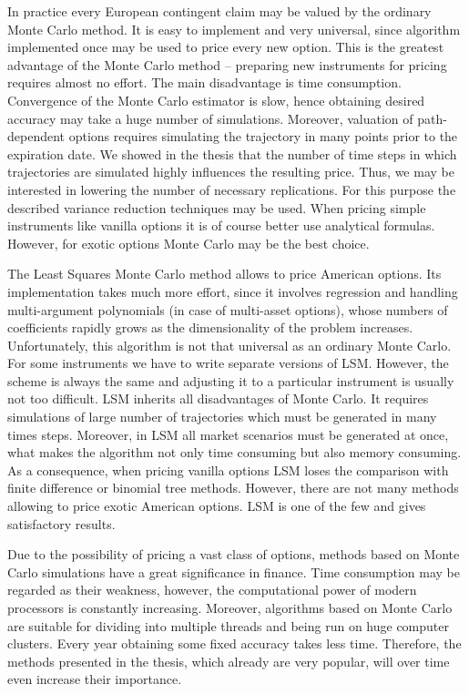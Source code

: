 \documentclass[a4paper,11pt, twoside]{book}
\theoremstyle{definition}
\theoremstyle{remark}
\begin{document}
In practice every European contingent claim may be valued by the ordinary Monte Carlo method. It is easy to implement and very universal, since algorithm implemented once may be used to price every new option. This is the greatest advantage of the Monte Carlo method -- preparing new instruments for pricing requires almost no effort. The main disadvantage is time consumption. Convergence of the Monte Carlo estimator is slow, hence obtaining desired accuracy may take a huge number of simulations. Moreover, valuation of path-dependent options requires simulating the trajectory in many points prior to the expiration date. We showed in the thesis that the number of time steps in which trajectories are simulated highly influences  the resulting price. Thus, we may be interested in lowering the number of necessary replications. For this purpose the described variance reduction techniques may be used. When pricing simple instruments like vanilla options it is of course better use analytical formulas. However, for exotic options Monte Carlo may be the best choice.


The Least Squares Monte Carlo method allows to price American options. Its implementation takes much more effort, since it involves regression and handling multi-argument polynomials (in case of multi-asset options), whose numbers of coefficients rapidly grows as the dimensionality of the problem increases. Unfortunately, this algorithm is not that universal as an ordinary Monte Carlo. For some instruments we have to write separate versions of LSM. However, the scheme is always the same and adjusting it to a particular instrument is usually not too difficult. LSM inherits all disadvantages of Monte Carlo. It requires simulations of large number of trajectories which must be generated in many times steps. Moreover, in LSM all market scenarios must be generated at once, what makes the algorithm not only time consuming but also memory consuming. As a consequence, when pricing vanilla options LSM loses the comparison with finite difference or binomial tree methods. However, there are not many methods allowing to price exotic American options. LSM is one of the few and gives satisfactory results.


Due to the possibility of pricing a vast class of options, methods based on Monte Carlo simulations have a great significance in finance. Time consumption may be regarded as their weakness, however, the computational power of modern processors is constantly increasing. Moreover, algorithms based on Monte Carlo are suitable for dividing into multiple threads and being run on huge computer clusters. Every year obtaining some fixed accuracy takes less time. Therefore, the methods presented in the thesis, which already are very popular, will over time even increase their importance.
\end{document}
